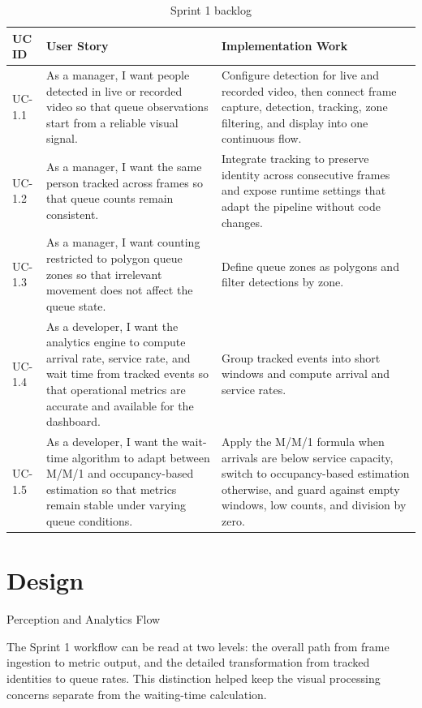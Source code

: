 \begin{table}[H]
    \centering
    \begingroup\setlength{\tabcolsep}{4pt}\renewcommand{\arraystretch}{0.95}\footnotesize
    \begin{tabularx}{\textwidth}{|l|X|X|}
        \hline
        UC ID & User Story & Implementation Work \\ \hline
        UC-1.1 & As a manager, I want people detected in live or recorded video so that queue observations start from a reliable visual signal. & Configure detection for live and recorded video, then connect frame capture, detection, tracking, zone filtering, and display into one continuous flow. \\ \hline
        UC-1.2 & As a manager, I want the same person tracked across frames so that queue counts remain consistent. & Integrate tracking to preserve identity across consecutive frames and expose runtime settings that adapt the pipeline without code changes. \\ \hline
        UC-1.3 & As a manager, I want counting restricted to polygon queue zones so that irrelevant movement does not affect the queue state. & Define queue zones as polygons and filter detections by zone. \\ \hline
        UC-1.4 & As a developer, I want the analytics engine to compute arrival rate, service rate, and wait time from tracked events so that operational metrics are accurate and available for the dashboard. & Group tracked events into short windows and compute arrival and service rates. \\ \hline
        UC-1.5 & As a developer, I want the wait-time algorithm to adapt between M/M/1 and occupancy-based estimation so that metrics remain stable under varying queue conditions. & Apply the M/M/1 formula when arrivals are below service capacity, switch to occupancy-based estimation otherwise, and guard against empty windows, low counts, and division by zero. \\ \hline
    \end{tabularx}
    \caption{Sprint 1 backlog}
    \label{tab:sprint1_backlog}
    \endgroup
\end{table}

\section{Design}

Perception and Analytics Flow

The Sprint 1 workflow can be read at two levels: the overall path from frame ingestion to metric output, and the detailed transformation from tracked identities to queue rates. This distinction helped keep the visual processing concerns separate from the waiting-time calculation.

